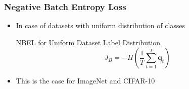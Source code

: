 \begin{frame}
	\frametitle{Negative Batch Entropy Loss}
	\begin{itemize}
		\item In case of datasets with uniform distribution of classes
			\begin{block}{NBEL for Uniform Dataset Label Distribution}
				\begin{equation*}
					J_B = -H(\frac{1}{T}\sum_{t=1}^{T}\mathbf{q}_t)
				\end{equation*}
			\end{block}
		\item This is the case for ImageNet and CIFAR-10
	\end{itemize}
\end{frame}

